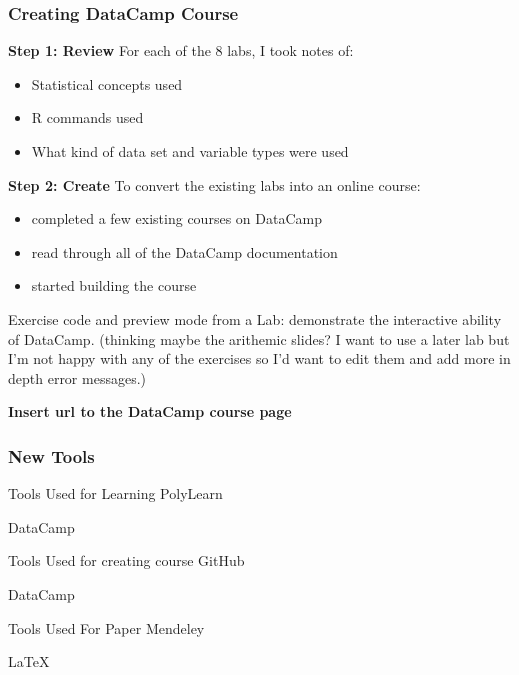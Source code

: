 \documentclass{beamer}
\begin{document}
\begin{frame}
\frametitle{Creating DataCamp Course}
\textbf{Step 1: Review}
For each of the 8 labs, I took notes of:
\begin{itemize}
 \item<1-> Statistical concepts used
 \item<2-> R commands used 
 \item<3-> What kind of data set and variable types were used
\end{itemize}
\textbf{Step 2: Create}
To convert the existing labs into an online course:
\begin{itemize}
  \item<1-> completed a few existing courses on DataCamp 
  \item<2-> read through all of the DataCamp documentation
  \item<3-> started building the course
\end{itemize}
\end{frame}

\begin{frame}
Exercise code and preview mode from a Lab: demonstrate the interactive ability of DataCamp. (thinking maybe the arithemic slides? I want to use a later lab but I'm not happy with any of the exercises so I'd want to edit them and add more in depth error messages.)

\textbf{Insert url to the DataCamp course page}

\end{frame}

\begin{frame}
\frametitle{New Tools}
\begin{block}{Tools Used for Learning}
PolyLearn 

DataCamp
\end{block}
\begin{block}{Tools Used for creating course}
GitHub

DataCamp
\end{block}
\begin{block}{Tools Used For Paper}
Mendeley

LaTeX
\end{block}
\end{frame}
\end{document}
